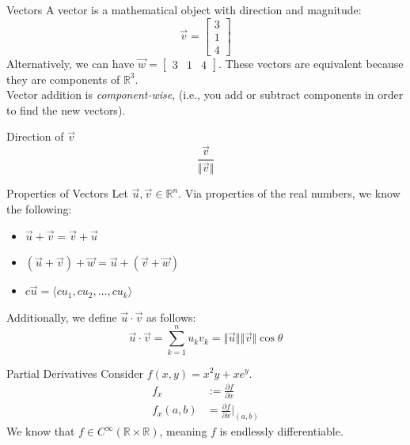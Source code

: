 \documentclass[8pt]{extarticle}
\begin{document}
  \begin{problem}{Vectors}
    A vector is a mathematical object with direction and magnitude:
    \[
      \vec{v} = \begin{bmatrix}
        3\\1\\4
      \end{bmatrix}
    \] 
    Alternatively, we can have $\vec{w} = \begin{bmatrix}3&1&4\end{bmatrix}$. These vectors are equivalent because they are components of $\mathbb{R}^3$.\\

    Vector addition is \textit{component-wise}, (i.e., you add or subtract components in order to find the new vectors).
    \begin{problem}{Direction of $\vec{v}$}
      \[
        \frac{\vec{v}}{\Vert\vec{v}\Vert}
      \] 
    \end{problem}
    \begin{problem}{Properties of Vectors}
      Let $\vec{u},\vec{v}\in \mathbb{R}^n$. Via properties of the real numbers, we know the following:
      \begin{itemize}
        \item $\vec{u} + \vec{v} = \vec{v} + \vec{u}$
        \item $(\vec{u} + \vec{v}) + \vec{w} = \vec{u} + (\vec{v} + \vec w)$
        \item $c\vec{u} = \langle cu_1,cu_2,\dots,cu_k\rangle$
      \end{itemize}
      Additionally, we define $\vec{u} \cdot \vec{v}$ as follows:
      \[
        \vec{u} \cdot \vec{v} = \sum_{k = 1}^{n} u_kv_k = \Vert\vec{u}\Vert\Vert\vec{v}\Vert\cos\theta
      \] 
    \end{problem}
  \end{problem}
  \begin{problem}{Partial Derivatives}
    Consider $f(x,y) = x^2y + xe^y$.
    \begin{align*}
      f_x &:= \frac{\partial f}{\partial x}\\
      f_x(a,b) &= \frac{\partial f}{\partial x}\biggr\rvert_{(a,b)}
    \end{align*}
    We know that $f\in C^{\infty}(\mathbb{R} \times \mathbb{R})$, meaning $f$ is endlessly differentiable.
  \end{problem}
\end{document}
